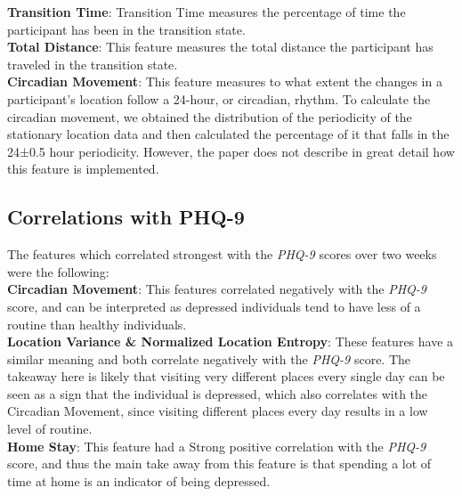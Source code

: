 \textbf{Transition Time}: Transition Time measures the percentage of time the participant has been in the transition state.\\

\textbf{Total Distance}: This feature measures the total distance the participant has traveled in the transition state.\\

\textbf{Circadian Movement}: This feature measures to what extent the changes in a
participant’s location follow a 24-hour, or circadian, rhythm. To calculate the circadian movement, we obtained the distribution of the periodicity of the stationary location data and then calculated the percentage of it that falls in the 24±0.5 hour periodicity. However, the paper does not describe in great detail how this feature is implemented.\\

\subsection{Correlations with PHQ-9}
The features which correlated strongest with the \textit{PHQ-9} scores over two weeks were the following:\\

\textbf{Circadian Movement}: This features correlated negatively with the \textit{PHQ-9} score, and can be interpreted as depressed individuals tend to have less of a routine than healthy individuals. \\

\textbf{Location Variance \& Normalized Location Entropy}: These features have a similar meaning and both correlate negatively with the \textit{PHQ-9} score. The takeaway here is likely that visiting very different places every single day can be seen as a sign that the individual is depressed, which also correlates with the Circadian Movement, since visiting different places every day results in a low level of routine.\\

\textbf{Home Stay}: This feature had a Strong positive correlation with the \textit{PHQ-9} score, and thus the main take away from this feature is that spending a lot of time at home is an indicator of being depressed.

